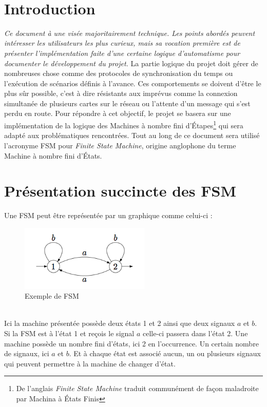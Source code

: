 \newpage
~ \thispagestyle{empty}

\tableofcontents

\newpage

\setcounter{page}{1}

\section{Introduction}
\textit{Ce document à une visée majoritairement technique. Les points abordés peuvent intéresser les utilisateurs les plus curieux, mais sa vocation première est de présenter l'implémentation faite d'une certaine logique d'automatisme pour documenter le développement du projet.}\p
La partie logique du projet doit gérer de nombreuses chose comme des protocoles de synchronisation du temps ou l'exécution de scénarios définis à l'avance. Ces comportements se doivent d'être le plus sûr possible, c'est à dire résistants aux imprévus comme la connexion simultanée de plusieurs cartes sur le réseau ou l'attente d'un message qui s'est perdu en route.\p
Pour répondre à cet objectif, le projet se basera sur une implémentation de la logique des Machines à nombre fini d'Étapes\footnote{De l'anglais \textit{Finite State Machine} traduit communément de façon maladroite par Machina à États Finis}\citep{encyclopediaArticle_Automatefini_} qui sera adapté aux problématiques rencontrées.\p
Tout au long de ce document sera utilisé l'acronyme FSM pour \textit{Finite State Machine}, origine anglophone du terme Machine à nombre fini d'États.

\section{Présentation succincte des FSM}
Une FSM peut être représentée par un graphique comme celui-ci :
\begin{figure}[htbp]
  \centering
  \includegraphics[width=0.55\textwidth]{figs/Automate-impair.png}
  \caption{Exemple de FSM}
  \label{fig:fsm_example}
\end{figure}~\\
Ici la machine présentée possède deux états 1 et 2 ainsi que deux signaux $a$ et $b$. Si la FSM est à l'état 1 et reçois le signal $a$ celle-ci passera dans l'état 2.\p
Une machine possède un nombre fini d'états, ici 2 en l'occurrence. Un certain nombre de signaux, ici $a$ et $b$. Et à chaque état est associé aucun, un ou plusieurs signaux qui peuvent permettre à la machine de changer d'état.

